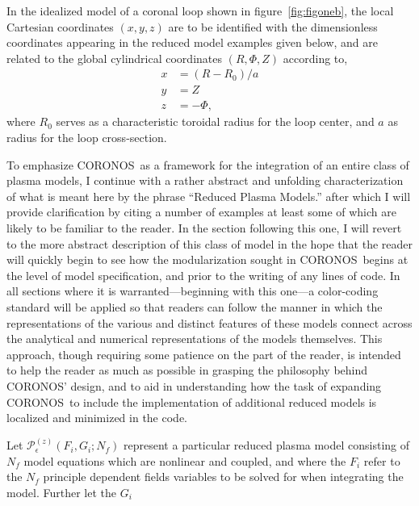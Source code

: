 \documentclass[12pt]{memoir}
\newcommand{\coronos}{\textsf{CORONOS}}
\newcommand{\pmodel}{\mathscr{P}}
\begin{document}
%
%
In the idealized model of a coronal loop shown in figure~\ref{fig:figoneb},
the local Cartesian coordinates $(x,y,z)$ are to be identified with the
dimensionless coordinates appearing in the reduced model examples given below,
and are related to the global cylindrical coordinates $(R,\Phi,Z)$ according
to,
%
\begin{subequations}
	      \begin{align}
		      x   &= (R - R_0)/a \\
		      y   &= Z           \\
		      z   &= -\Phi,
	      \end{align}
\end{subequations}
%
where $R_0$ serves as a characteristic toroidal radius for the loop
center, and $a$ as radius for the loop cross-section.
%
\par
%
To emphasize \coronos\ as a framework for the integration of an entire
class of plasma models, I continue with a rather abstract and unfolding
characterization of what is meant here by the phrase ``Reduced
Plasma Models.''  after which I will provide clarification by citing
a number of examples at least some of which are likely to be familiar
to the reader.
%
In the section following this one, I will revert to the more abstract
description of this class of model in the hope that the reader will
quickly begin to see how the modularization sought in \coronos\ begins
at the level of model specification, and prior to the writing of any lines
of code.
%
In all sections where it is warranted---beginning with this one---a
color-coding standard will be applied so that readers can follow the 
manner in which the representations of the various and distinct features
of these models connect across the analytical and numerical representations
of the models themselves. This approach, though requiring some patience 
on the part of the reader, is intended to help the reader as much as 
possible in grasping the philosophy behind \coronos' design, and to aid in
understanding how the task of expanding \coronos\ to include the 
implementation of additional reduced models is localized and minimized
in the code.
%
\par
%
Let $\pmodel^{(z)}_\epsilon(F_i, G_i; N_f)$ represent a particular reduced
plasma model consisting of $N_f$ model equations which are nonlinear and
coupled, and where the $F_i$ refer to the $N_f$ principle dependent fields
variables to be solved for when integrating the model. Further let the $G_i$
\end{document}
